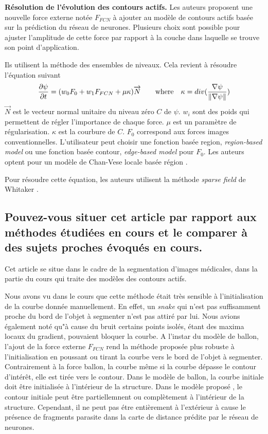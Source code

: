\documentclass[a4paper, 11pt]{article}
\begin{document}
\textbf{Résolution de l'évolution des contours actifs.} Les auteurs proposent une nouvelle force externe notée $F_{FCN}$ à ajouter au modèle de contours actifs basée sur la prédiction du réseau de neurones. Plusieurs choix sont possible pour ajuster l'amplitude de cette force par rapport à la couche dans laquelle se trouve son point d'application. %

Ils utilisent la méthode des ensembles de niveaux. Cela revient à résoudre l'équation suivant 
$$
\frac{\partial \psi}{\partial t} = (w_0F_0 + w_1F_{FCN} + \mu\kappa)\overrightarrow{N} \qquad \textrm{where} \quad \kappa = div(\frac{\nabla \psi}{\left\lVert\nabla\psi\right\rVert})
$$
$\overrightarrow{N}$ est le vecteur normal unitaire du niveau zéro $C$ de $\psi$. $w_i$ sont des poids qui permettent de régler l'importance de chaque force. $\mu$ est un paramètre de régularisation. $\kappa$ est la courbure de $C$.
$F_0$ correspond aux forces images conventionnelles. L'utilisateur peut choisir une fonction basée region, \textit {region-based model} \cite{caselles_geodesic_1997} ou une fonction basée contour, \textit{edge-based model} \cite{chan_active_2001} pour $F_0$. Les auteurs optent pour un modèle de Chan-Vese locale basée région \cite{lankton_localizing_2008}. 

Pour résoudre cette équation, les auteurs utilisent la méthode \textit{sparse field} de Whitaker \cite{whitaker_level-set_1998}. 


\subsection{Pouvez-vous situer cet article par rapport aux méthodes étudiées en cours et le comparer à des sujets proches évoqués en cours.}

Cet article se situe dans le cadre de la segmentation d'images médicales, dans la partie du cours qui traite des modèles des contours actifs. 

Nous avons vu dans le cours que cette méthode était très sensible à l'initialisation de la courbe donnée manuellement. En effet, un \textit{snake} qui n'est pas suffisamment proche du bord de l'objet à segmenter n'est pas attiré par lui. Nous avions également noté qu"à cause du bruit certains points isolés, étant des maxima locaux du gradient, pouvaient bloquer la courbe. A l'instar du modèle de ballon, l'ajout de la force externe $F_{FCN}$ rend la méthode proposée plus robuste à l'initialisation en poussant ou tirant la courbe vers le bord de l'objet à segmenter. Contrairement à la force ballon, la courbe même si la courbe dépasse le contour d'intérêt, elle est tirée vers le contour. Dans le modèle de ballon, la courbe initiale doit être initialisée à l'intérieur de la structure. Dans le modèle proposé \cite{guo_automatic_2019}, le contour initiale peut être partiellemnent ou complètement à l'intérieur de la structure. Cependant, il ne peut pas étre entièrement à l'extérieur à cause le présence de fragments parasite dans la carte de distance prédite par le réseau de neurones. 
\end{document}
